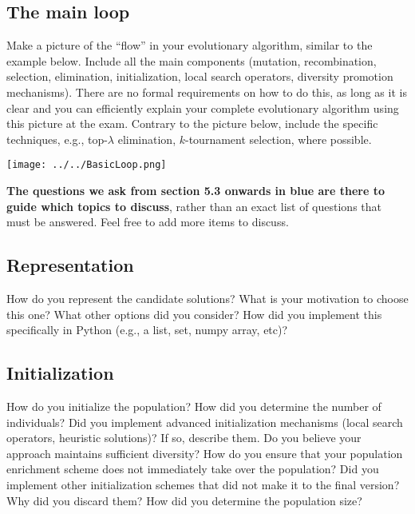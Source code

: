 \documentclass[a4paper,10pt]{article}
\newcommand{\ReplaceMe}[1]{{\color{blue}#1}}
\newcommand{\RemoveMe}[1]{{\color{purple}#1}}
\begin{document}
\subsection{The main loop}

\ReplaceMe{Make a picture of the ``flow'' in your evolutionary algorithm, similar to the example below. Include all the main components (mutation, recombination, selection, elimination, initialization, local search operators, diversity promotion mechanisms). There are no formal requirements on how to do this, as long as it is clear and you can efficiently explain your complete evolutionary algorithm using this picture at the exam. Contrary to the picture below, include the specific techniques, e.g., top-$\lambda$ elimination, $k$-tournament selection, where possible.}

\begin{center}
\texttt{[image: ../../BasicLoop.png]}
\end{center}

\clearpage
\RemoveMe{\textbf{The questions we ask from section 5.3 onwards in blue are there to guide which topics to discuss}, rather than an exact list of questions that must be answered. Feel free to add more items to discuss.}


\subsection{Representation}

\ReplaceMe{How do you represent the candidate solutions? What is your motivation to choose this one? What other options did you consider? How did you implement this specifically in Python (e.g., a list, set, numpy array, etc)?}

\subsection{Initialization}

\ReplaceMe{How do you initialize the population? How did you determine the number of individuals? Did you implement advanced initialization mechanisms (local search operators, heuristic solutions)? If so, describe them. Do you believe your approach maintains sufficient diversity? How do you ensure that your population enrichment scheme does not immediately take over the population? Did you implement other initialization schemes that did not make it to the final version? Why did you discard them? How did you determine the population size?}
\end{document}
